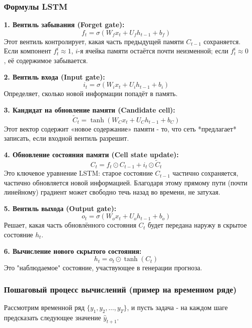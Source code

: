 \documentclass[12pt,a4paper]{article}
\begin{document}
\subsubsection*{Формулы LSTM}

\textbf{1. Вентиль забывания (Forget gate):}
\[
f_t = \sigma(W_f x_t + U_f h_{t-1} + b_f)
\]
Этот вентиль контролирует, какая часть предыдущей памяти \(C_{t-1}\) сохраняется.
Если компонент \(f_t^i \approx 1\), $i$-я ячейка памяти остаётся почти неизменной; если \(f_t^i \approx 0\), её содержимое забывается.

\textbf{2. Вентиль входа (Input gate):}
\[
i_t = \sigma(W_i x_t + U_i h_{t-1} + b_i)
\]
Определяет, сколько новой информации попадёт в память.

\textbf{3. Кандидат на обновление памяти (Candidate cell):}
\[
\tilde{C}_t = \tanh(W_C x_t + U_C h_{t-1} + b_C)
\]
Этот вектор содержит «новое содержание» памяти - то, что сеть *предлагает* записать, если входной вентиль разрешит.

\textbf{4. Обновление состояния памяти (Cell state update):}
\[
C_t = f_t \odot C_{t-1} + i_t \odot \tilde{C}_t
\]
Это ключевое уравнение LSTM: старое состояние \(C_{t-1}\) частично сохраняется, частично обновляется новой информацией.
Благодаря этому прямому пути (почти линейному) градиент может свободно течь назад во времени, не затухая.

\textbf{5. Вентиль выхода (Output gate):}
\[
o_t = \sigma(W_o x_t + U_o h_{t-1} + b_o)
\]
Решает, какая часть обновлённого состояния \(C_t\) будет передана наружу в скрытое состояние \(h_t\).

\textbf{6. Вычисление нового скрытого состояния:}
\[
h_t = o_t \odot \tanh(C_t)
\]
Это "наблюдаемое" состояние, участвующее в генерации прогноза.

\subsubsection*{Пошаговый процесс вычислений (пример на временном ряде)}

Рассмотрим временной ряд \( \{y_1, y_2, \ldots, y_T\} \), и пусть задача - на каждом шаге предсказать следующее значение \( \hat{y}_{t+1} \).
\end{document}
